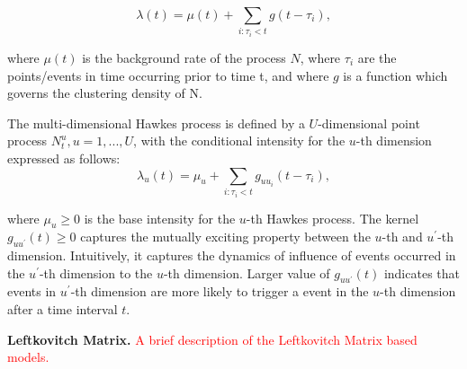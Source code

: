  $$\lambda(t) = \mu(t)+\sum_{i:\tau_i<t}g(t-\tau_i),$$
 
where $\mu(t)$ is the background rate of the process  $N$, where $\tau_i$ are the points/events in time occurring prior to time t, and where $g$ is a function which governs the clustering density of N. 

The multi-dimensional Hawkes process is defined by a $U$-dimensional point process $N_t^u, u =1, . . . , U$, with the conditional intensity for the $u$-th dimension expressed as follows:
$$\lambda_u(t) = \mu_u + \sum_{i:\tau_i<t} g_{uu_i}(t-\tau_i),$$

where $\mu_u \ge 0$ is the base intensity for the $u$-th Hawkes process. The kernel $g_{uu^\prime}(t) \ge 0$ captures the mutually exciting property between the $u$-th and $u^\prime$-th dimension. Intuitively, it captures the dynamics of influence of events occurred in the $u^\prime$-th dimension to the $u$-th dimension. Larger value of $g_{uu^\prime}(t)$  indicates that events in $u^\prime$-th dimension are more likely to trigger a event in the $u$-th dimension after a time interval $t$.

\textbf{Leftkovitch Matrix.} \textcolor{red}{A brief description of the Leftkovitch Matrix based models.}
\fi


